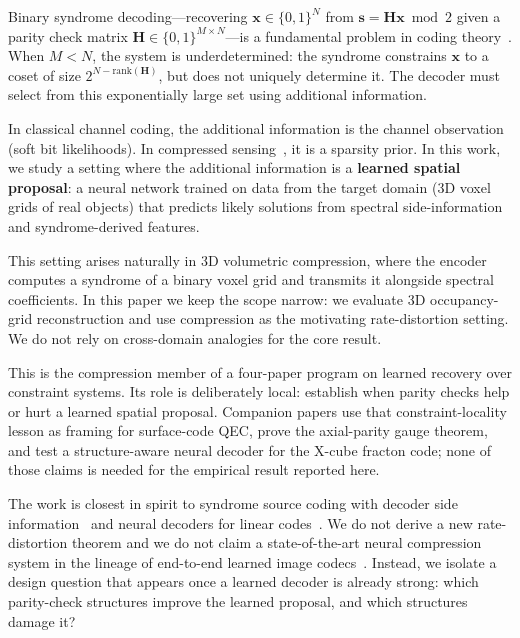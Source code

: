 \documentclass[11pt,a4paper]{article}
\begin{document}
Binary syndrome decoding---recovering $\mathbf{x} \in \{0,1\}^N$ from
$\mathbf{s} = \mathbf{H}\mathbf{x} \bmod 2$ given a parity check
matrix $\mathbf{H} \in \{0,1\}^{M \times N}$---is a fundamental
problem in coding theory~\cite{gallager}. When $M < N$, the system is
underdetermined: the syndrome constrains $\mathbf{x}$ to a coset of
size $2^{N-\text{rank}(\mathbf{H})}$, but does not uniquely determine
it. The decoder must select from this exponentially large set using
additional information.

In classical channel coding, the additional information is the channel
observation (soft bit likelihoods). In compressed
sensing~\cite{candes2006}, it is a sparsity prior. In this work, we
study a setting where the additional information is a \textbf{learned
spatial proposal}: a neural network trained on data from the target domain
(3D voxel grids of real objects) that predicts likely solutions from
spectral side-information and syndrome-derived features.

This setting arises naturally in 3D volumetric compression, where the
encoder computes a syndrome of a binary voxel grid and transmits it
alongside spectral coefficients. In this paper we keep the scope narrow:
we evaluate 3D occupancy-grid reconstruction and use compression as the
motivating rate-distortion setting. We do not rely on cross-domain analogies
for the core result.

This is the compression member of a four-paper program on learned recovery over
constraint systems. Its role is deliberately local: establish when parity
checks help or hurt a learned spatial proposal. Companion papers use that
constraint-locality lesson as framing for surface-code QEC, prove the
axial-parity gauge theorem, and test a structure-aware neural decoder for the
X-cube fracton code; none of those claims is needed for the empirical result
reported here.

The work is closest in spirit to syndrome source coding with decoder side
information~\cite{slepianwolf,wynerziv} and neural decoders for linear
codes~\cite{nachmani2016,nachmani2018}. We do not derive a new
rate-distortion theorem and we do not claim a state-of-the-art neural
compression system in the lineage of end-to-end learned image
codecs~\cite{balle2017,minnen2018}. Instead, we isolate a design question
that appears once a learned decoder is already strong: which parity-check
structures improve the learned proposal, and which structures damage it?
\end{document}
